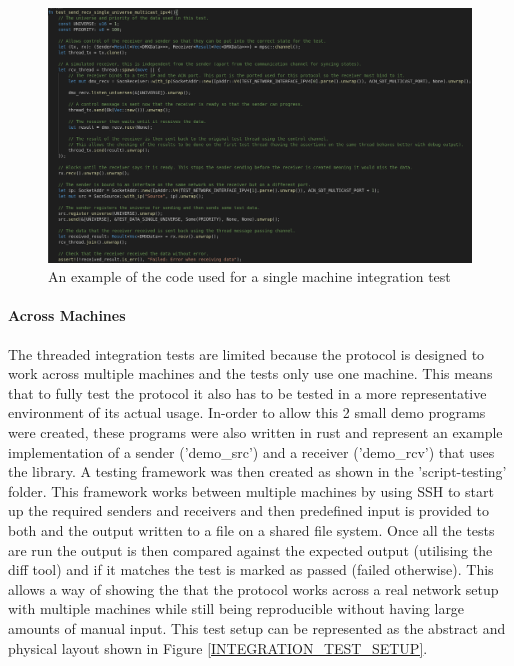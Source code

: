 \documentclass[11pt,a4paper]{article}
\begin{document}
\begin{figure}[H]
	\begin{turn}{90}
		\begin{minipage}[c][\textwidth][c]{\textheight}
			\centering
			\includegraphics[width=\textwidth]{integration-test-example.png}
			\caption{An example of the code used for a single machine integration test}
			\label{UNIT_INTEGRATION_TEST}
		\end{minipage}
	\end{turn}
\end{figure}

\paragraph{Across Machines}
The threaded integration tests are limited because the protocol is designed to work across multiple machines and the tests only use one machine. This means that to fully test the protocol it also has to be tested in a more representative environment of its actual usage. In-order to allow this 2 small demo programs were created, these programs were also written in rust and represent an example implementation of a sender ('demo\_src') and a receiver ('demo\_rcv') that uses the library. A testing framework was then created as shown in the 'script-testing' folder. This framework works between multiple machines by using SSH to start up the required senders and receivers and then predefined input is provided to both and the output written to a file on a shared file system. Once all the tests are run the output is then compared against the expected output (utilising the diff tool) and if it matches the test is marked as passed (failed otherwise). This allows a way of showing the that the protocol works across a real network setup with multiple machines while still being reproducible without having large amounts of manual input. This test setup can be represented as the abstract and physical layout shown in Figure \ref{INTEGRATION_TEST_SETUP}.
\end{document}
